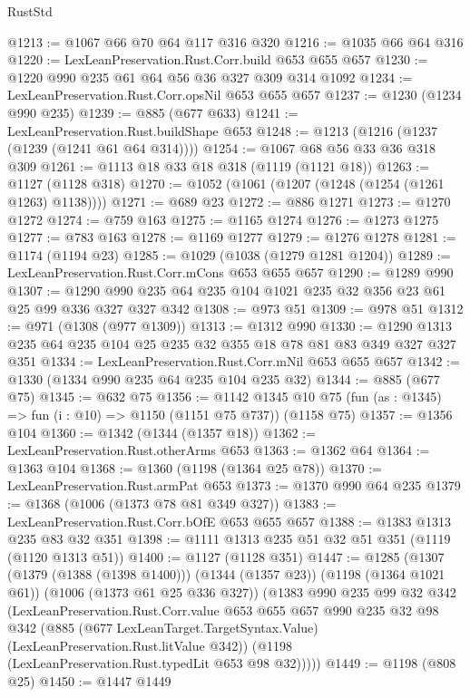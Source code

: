 \begin{lexlean}{RustStd}
\begin{coremodule}
@1213 := @1067 @66 @70 @64 @117 @316 @320
@1216 := @1035 @66 @64 @316
@1220 := LexLeanPreservation.Rust.Corr.build @653 @655 @657
@1230 := @1220 @990 @235 @61 @64 @56 @36 @327 @309 @314 @1092
@1234 := LexLeanPreservation.Rust.Corr.opsNil @653 @655 @657
@1237 := @1230 (@1234 @990 @235)
@1239 := @885 (@677 @633)
@1241 := LexLeanPreservation.Rust.buildShape @653
@1248 := @1213 (@1216 (@1237 (@1239 (@1241 @61 @64 @314))))
@1254 := @1067 @68 @56 @33 @36 @318 @309
@1261 := @1113 @18 @33 @18 @318 (@1119 (@1121 @18))
@1263 := @1127 (@1128 @318)
@1270 := @1052 (@1061 (@1207 (@1248 (@1254 (@1261 @1263) @1138))))
@1271 := @689 @23
@1272 := @886 @1271
@1273 := @1270 @1272
@1274 := @759 @163
@1275 := @1165 @1274
@1276 := @1273 @1275
@1277 := @783 @163
@1278 := @1169 @1277
@1279 := @1276 @1278
@1281 := @1174 (@1194 @23)
@1285 := @1029 (@1038 (@1279 @1281 @1204))
@1289 := LexLeanPreservation.Rust.Corr.mCons @653 @655 @657
@1290 := @1289 @990
@1307 := @1290 @990 @235 @64 @235 @104 @1021 @235 @32 @356 @23 @61 @25 @99 @336 @327 @327 @342
@1308 := @973 @51
@1309 := @978 @51
@1312 := @971 (@1308 (@977 @1309))
@1313 := @1312 @990
@1330 := @1290 @1313 @235 @64 @235 @104 @25 @235 @32 @355 @18 @78 @81 @83 @349 @327 @327 @351
@1334 := LexLeanPreservation.Rust.Corr.mNil @653 @655 @657
@1342 := @1330 (@1334 @990 @235 @64 @235 @104 @235 @32)
@1344 := @885 (@677 @75)
@1345 := @632 @75
@1356 := @1142
    @1345
    @10
    @75
    (fun (as : @1345) => fun (i : @10) => @1150 (@1151 @75 @737))
    (@1158 @75)
@1357 := @1356 @104
@1360 := @1342 (@1344 (@1357 @18))
@1362 := LexLeanPreservation.Rust.otherArms @653
@1363 := @1362 @64
@1364 := @1363 @104
@1368 := @1360 (@1198 (@1364 @25 @78))
@1370 := LexLeanPreservation.Rust.armPat @653
@1373 := @1370 @990 @64 @235
@1379 := @1368 (@1006 (@1373 @78 @81 @349 @327))
@1383 := LexLeanPreservation.Rust.Corr.bOfE @653 @655 @657
@1388 := @1383 @1313 @235 @83 @32 @351
@1398 := @1111 @1313 @235 @51 @32 @51 @351 (@1119 (@1120 @1313 @51))
@1400 := @1127 (@1128 @351)
@1447 := @1285
    (@1307
      (@1379 (@1388 (@1398 @1400)))
      (@1344 (@1357 @23))
      (@1198 (@1364 @1021 @61))
      (@1006 (@1373 @61 @25 @336 @327))
      (@1383
        @990
        @235
        @99
        @32
        @342
        (LexLeanPreservation.Rust.Corr.value
          @653
          @655
          @657
          @990
          @235
          @32
          @98
          @342
          (@885 (@677 LexLeanTarget.TargetSyntax.Value) (LexLeanPreservation.Rust.litValue @342))
          (@1198 (LexLeanPreservation.Rust.typedLit @653 @98 @32)))))
@1449 := @1198 (@808 @25)
@1450 := @1447 @1449

\end{coremodule}
\end{lexlean}
